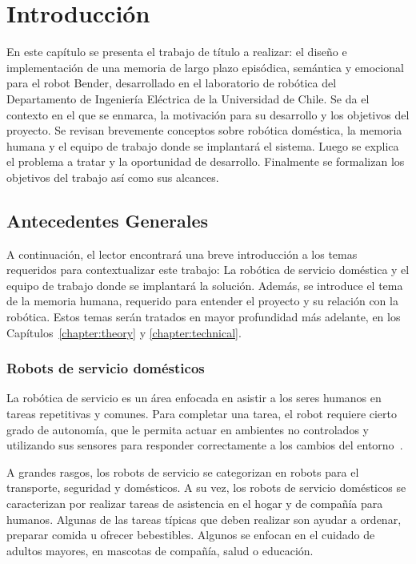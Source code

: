 \chapter{Introducción}\label{chapter:introduction}


En este capítulo se presenta el trabajo de título a realizar: el diseño e implementación de una memoria de largo plazo episódica, semántica y emocional para el robot Bender, desarrollado en el laboratorio de robótica del Departamento de Ingeniería Eléctrica de la Universidad de Chile. Se da el contexto en el que se enmarca, la motivación para su desarrollo y los objetivos del proyecto. Se revisan brevemente conceptos sobre robótica doméstica, la memoria humana y el equipo de trabajo donde se implantará el sistema. Luego se explica el problema a tratar y la oportunidad de desarrollo. Finalmente se formalizan los objetivos del trabajo así como sus alcances.


\section{Antecedentes Generales}

A continuación, el lector encontrará una breve introducción a los temas requeridos para contextualizar este trabajo: La robótica de servicio doméstica y el equipo de trabajo donde se implantará la solución. Además, se introduce el tema de la memoria humana, requerido para entender el proyecto y su relación con la robótica. Estos temas serán tratados en mayor profundidad más adelante, en los Capítulos~\ref{chapter:theory} y \ref{chapter:technical}.


\subsection{Robots de servicio domésticos}

La robótica de servicio es un área enfocada en asistir a los seres humanos en tareas repetitivas y comunes. Para completar una tarea, el robot requiere cierto grado de autonomía, que le permita actuar en ambientes no controlados y utilizando sus sensores para responder correctamente a los cambios del entorno~\cite{IFR}.

A grandes rasgos, los robots de servicio se categorizan en robots para el transporte, seguridad y domésticos. A su vez, los robots de servicio domésticos se caracterizan por realizar tareas de asistencia en el hogar y de compañía para humanos. Algunas de las tareas típicas que deben realizar son ayudar a ordenar, preparar comida u ofrecer bebestibles. Algunos se enfocan en el cuidado de adultos mayores, en mascotas de compañía, salud o educación.

